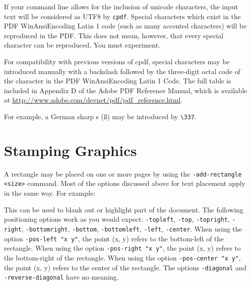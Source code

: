 \documentclass{book}
\begin{document}
If your command line allows for the inclusion of unicode characters, the input
text will be considered as UTF8 by \verb!cpdf!. Special characters which exist
in the PDF WinAnsiEncoding Latin 1 code (such as many accented characters) will
be reproduced in the PDF. This does not mean, however, that every special
character can be reproduced. You must experiment.

For compatibility with previous versions of cpdf, special characters may be
introduced manually with a backslash followed by the three-digit octal code of
the character in the PDF WinAnsiEncoding Latin 1 Code. The full table is
included in Appendix D of the Adobe PDF Reference Manual, which is available at
\url{http://www.adobe.com/devnet/pdf/pdf_reference.html}.

For example, a German sharp s (\ss) may be introduced by \verb!\337!. 



\section{Stamping Graphics}

A rectangle may be placed on one or more pages by using the \texttt{-add-rectangle <size>} command. Most of the options discussed above for text placement apply in the same way. For example:

\noindent{}

This can be used to blank out or highlight part of the document. The following positioning options work as you would expect: \texttt{-topleft}, \texttt{-top}, \texttt{-topright}, \texttt{-right}, \texttt{-bottomright}, \texttt{-bottom}, \texttt{-bottomleft}, \texttt{-left}, \texttt{-center}. When using the option \texttt{-pos-left "x y"}, the point (x, y) refers to the bottom-left of the rectangle. When using the option \texttt{-pos-right "x y"}, the point (x, y) refers to the bottom-right of the rectangle. When using the option \texttt{-pos-center "x y"}, the point (x, y) refers to the center of the rectangle. The options \texttt{-diagonal} and \texttt{-reverse-diagonal} have no meaning.\pagestyle{empty}\thispagestyle{fancy}
\end{document}
